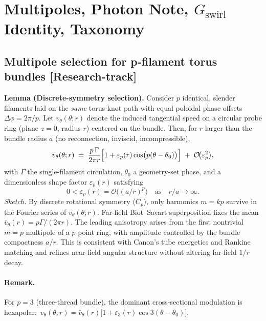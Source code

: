\documentclass[10pt,reprint,aps,onecolumn,nofootinbib]{revtex4-2}
\newcommand{\statusResearch}{\textsf{[Research-track]}}
\begin{document}
\section{Multipoles, Photon Note, \texorpdfstring{\(G_{\text{swirl}}\)}{G_swirl} Identity, Taxonomy}

\subsection{Multipole selection for p-filament torus bundles \statusResearch}
    \textbf{Lemma (Discrete-symmetry selection).}
    Consider \(p\) identical, slender filaments laid on the \emph{same} torus-knot path with equal poloidal phase offsets \(\Delta\phi=2\pi/p\). Let \(v_\theta(\theta;r)\) denote the induced tangential speed on a circular probe ring (plane \(z=0\), radius \(r\)) centered on the bundle. Then, for \(r\) larger than the bundle radius \(a\) (no reconnection, inviscid, incompressible),
    \[
        v_\theta(\theta;r)\;=\;\frac{p\,\Gamma}{2\pi r}\Bigl[1+\varepsilon_p(r)\cos\!\big(p(\theta-\theta_0)\big)\Bigr]
        \;+\;\mathcal{O}\!\big(\varepsilon_p^2\big),
    \]
    with \(\Gamma\) the single-filament circulation, \(\theta_0\) a geometry-set phase, and a dimensionless shape factor \(\varepsilon_p(r)\) satisfying
    \[
        0<\varepsilon_p(r)=\mathcal{O}\!\big((a/r)^p\big)\quad\text{as}\quad r/a\to\infty.
    \]
    \emph{Sketch.} By discrete rotational symmetry (\(C_p\)), only harmonics \(m=kp\) survive in the Fourier series of \(v_\theta(\theta;r)\). Far-field Biot–Savart superposition fixes the mean \(\bar v_\theta(r)=p\Gamma/(2\pi r)\). The leading anisotropy arises from the first nontrivial \(m=p\) multipole of a \(p\)-point ring, with amplitude controlled by the bundle compactness \(a/r\). This is consistent with Canon’s tube energetics and Rankine matching and refines near-field angular structure without altering far-field \(1/r\) decay.

    \paragraph{Remark.}
        For \(p=3\) (three-thread bundle), the dominant cross-sectional modulation is hexapolar:
        \(\,v_\theta(\theta;r)=\bar v_\theta(r)\big[1+\varepsilon_3(r)\cos 3(\theta-\theta_0)\big]\).

\end{document}
